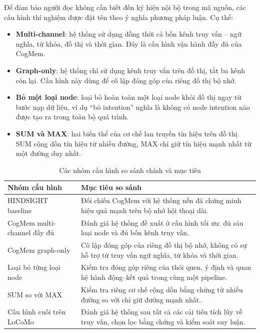 \documentclass[../main.tex]{subfiles}
\begin{document}
Để đảm bảo người đọc không cần biết đến ký hiệu nội bộ trong mã nguồn, các cấu hình thí nghiệm được đặt tên theo ý nghĩa phương pháp luận. Cụ thể:

\begin{itemize}
    \item \textbf{Multi-channel}: hệ thống sử dụng đồng thời cả bốn kênh truy vấn -- ngữ nghĩa, từ khóa, đồ thị và thời gian. Đây là cấu hình vận hành đầy đủ của CogMem.
    \item \textbf{Graph-only}: hệ thống chỉ sử dụng kênh truy vấn trên đồ thị, tắt ba kênh còn lại. Cấu hình này dùng để cô lập đóng góp của riêng đồ thị bộ nhớ.
    \item \textbf{Bỏ một loại node}: loại bỏ hoàn toàn một loại node khỏi đồ thị ngay từ bước nạp dữ liệu, ví dụ ``bỏ intention'' nghĩa là không có node intention nào được tạo ra trong toàn bộ quá trình.
    \item \textbf{SUM và MAX}: hai biến thể của cơ chế lan truyền tín hiệu trên đồ thị. SUM cộng dồn tín hiệu từ nhiều đường, MAX chỉ giữ tín hiệu mạnh nhất từ một đường duy nhất.
\end{itemize}

\begin{table}[H]
\centering
\caption{Các nhóm cấu hình so sánh chính và mục tiêu}
\label{tab:experiment_config_groups}
\small
\begin{tabularx}{\linewidth}{@{}p{3.4cm}p{10.6cm}@{}}
\toprule
\textbf{Nhóm cấu hình} & \textbf{Mục tiêu so sánh} \\
\midrule
HINDSIGHT baseline & Đối chiếu CogMem với hệ thống nền đã chứng minh hiệu quả mạnh trên bộ nhớ hội thoại dài. \\
CogMem multi-channel đầy đủ & Đánh giá hệ thống đề xuất ở cấu hình tối ưu: đủ sáu loại node và đủ bốn kênh truy vấn. \\
CogMem graph-only & Cô lập đóng góp của riêng đồ thị bộ nhớ, không có sự hỗ trợ từ truy vấn ngữ nghĩa, từ khóa và thời gian. \\
Loại bỏ từng loại node & Kiểm tra đóng góp riêng của thói quen, ý định và quan hệ hành động--kết quả trong cùng một pipeline. \\
SUM so với MAX & Kiểm tra riêng cơ chế cộng dồn bằng chứng từ nhiều đường so với chỉ giữ đường mạnh nhất. \\
Cấu hình cuối trên LoCoMo & Đánh giá hệ thống sau tất cả các cải tiến tích lũy về truy vấn, chọn lọc bằng chứng và kiểm soát suy luận. \\
\bottomrule
\end{tabularx}
\end{table}
\end{document}
